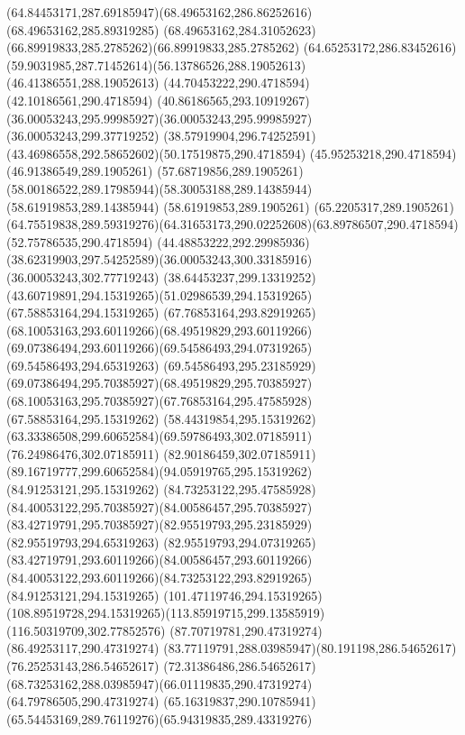 {{\curveto(64.84453171,287.69185947)(68.49653162,286.86252616)(68.49653162,285.89319285)
\curveto(68.49653162,284.31052623)(66.89919833,285.2785262)(66.89919833,285.2785262)
\curveto(64.65253172,286.83452616)(59.9031985,287.71452614)(56.13786526,288.19052613)
\lineto(46.41386551,288.19052613)
\lineto(44.70453222,290.4718594)
\lineto(42.10186561,290.4718594)
\curveto(40.86186565,293.10919267)(36.00053243,295.99985927)(36.00053243,295.99985927)
\lineto(36.00053243,299.37719252)
\curveto(38.57919904,296.74252591)(43.46986558,292.58652602)(50.17519875,290.4718594)
\lineto(45.95253218,290.4718594)
\lineto(46.91386549,289.1905261)
\lineto(57.68719856,289.1905261)
\curveto(58.00186522,289.17985944)(58.30053188,289.14385944)(58.61919853,289.14385944)
\lineto(58.61919853,289.1905261)
\lineto(65.2205317,289.1905261)
\curveto(64.75519838,289.59319276)(64.31653173,290.02252608)(63.89786507,290.4718594)
\lineto(52.75786535,290.4718594)
\curveto(44.48853222,292.29985936)(38.62319903,297.54252589)(36.00053243,300.33185916)
\lineto(36.00053243,302.77719243)
\curveto(38.64453237,299.13319252)(43.60719891,294.15319265)(51.02986539,294.15319265)
\lineto(67.58853164,294.15319265)
\curveto(67.76853164,293.82919265)(68.10053163,293.60119266)(68.49519829,293.60119266)
\curveto(69.07386494,293.60119266)(69.54586493,294.07319265)(69.54586493,294.65319263)
\curveto(69.54586493,295.23185929)(69.07386494,295.70385927)(68.49519829,295.70385927)
\curveto(68.10053163,295.70385927)(67.76853164,295.47585928)(67.58853164,295.15319262)
\lineto(58.44319854,295.15319262)
\curveto(63.33386508,299.60652584)(69.59786493,302.07185911)(76.24986476,302.07185911)
\curveto(82.90186459,302.07185911)(89.16719777,299.60652584)(94.05919765,295.15319262)
\lineto(84.91253121,295.15319262)
\curveto(84.73253122,295.47585928)(84.40053122,295.70385927)(84.00586457,295.70385927)
\curveto(83.42719791,295.70385927)(82.95519793,295.23185929)(82.95519793,294.65319263)
\curveto(82.95519793,294.07319265)(83.42719791,293.60119266)(84.00586457,293.60119266)
\curveto(84.40053122,293.60119266)(84.73253122,293.82919265)(84.91253121,294.15319265)
\lineto(101.47119746,294.15319265)
\curveto(108.89519728,294.15319265)(113.85919715,299.13585919)(116.50319709,302.77852576)
\moveto(87.70719781,290.47319274)
\lineto(86.49253117,290.47319274)
\curveto(83.77119791,288.03985947)(80.191198,286.54652617)(76.25253143,286.54652617)
\curveto(72.31386486,286.54652617)(68.73253162,288.03985947)(66.01119835,290.47319274)
\lineto(64.79786505,290.47319274)
\curveto(65.16319837,290.10785941)(65.54453169,289.76119276)(65.94319835,289.43319276)
}}
